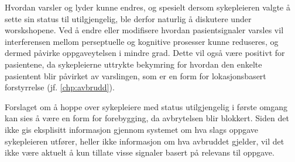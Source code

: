\noindent
Hvordan varsler og lyder kunne endres, og spesielt dersom sykepleieren valgte å sette sin status til utilgjengelig, ble derfor naturlig å diskutere under worskshopene.
Ved å endre eller modifisere hvordan pasientsignaler varsles vil interferensen mellom perseptuelle og kognitive prosesser kunne reduseres, og dermed påvirke oppgaveytelsen i mindre grad. Dette vil også være positivt for pasientene, da sykepleierne uttrykte bekymring for hvordan den enkelte pasientent blir påvirket av varslingen, som er en form for lokasjonsbasert forstyrrelse (jf. \ref{chp:avbrudd}). 

\noindent
Forslaget om å hoppe over sykepleiere med status utilgjengelig i første omgang kan sies å være en form for forebygging, da avbrytelsen blir blokkert. Siden det ikke gis eksplisitt informasjon gjennom systemet om hva slags oppgave sykepleieren utfører, heller ikke informasjon om hva avbruddet gjelder, vil det ikke være aktuelt å kun tillate visse signaler basert på relevans til oppgave. 

